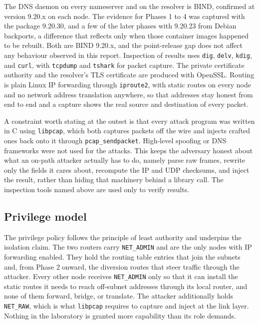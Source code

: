 \documentclass[11pt]{article}
\begin{document}
The DNS daemon on every nameserver and on the resolver is BIND, confirmed at
version 9.20.x on each node. The evidence for Phases 1 to 4 was captured with the
package 9.20.30, and a few of the later phases with 9.20.23 from Debian
backports, a difference that reflects only when those container images happened
to be rebuilt. Both are BIND 9.20.x, and the point-release gap does not affect any
behaviour observed in this report. Inspection of results uses \texttt{dig},
\texttt{delv}, \texttt{kdig}, and \texttt{curl}, with \texttt{tcpdump} and
\texttt{tshark} for packet capture. The private certificate authority and the
resolver's TLS certificate are produced with OpenSSL. Routing is plain Linux IP
forwarding through \texttt{iproute2}, with static routes on every node and no
network address translation anywhere, so that addresses stay honest from end to
end and a capture shows the real source and destination of every packet.

A constraint worth stating at the outset is that every attack program was written
in C using \texttt{libpcap}, which both captures packets off the wire and injects
crafted ones back onto it through \texttt{pcap\_sendpacket}. High-level spoofing
or DNS frameworks were not used for the attacks. This keeps the adversary honest
about what an on-path attacker actually has to do, namely parse raw frames,
rewrite only the fields it cares about, recompute the IP and UDP checksums, and
inject the result, rather than hiding that machinery behind a library call. The
inspection tools named above are used only to verify results.

\subsection{Privilege model}

The privilege policy follows the principle of least authority and underpins the
isolation claim. The two routers carry \texttt{NET\_ADMIN} and are the only nodes
with IP forwarding enabled. They hold the routing table entries that join the
subnets and, from Phase 2 onward, the diversion routes that steer traffic through
the attacker. Every other node receives \texttt{NET\_ADMIN} only so that it can
install the static routes it needs to reach off-subnet addresses through its local
router, and none of them forward, bridge, or translate. The attacker additionally
holds \texttt{NET\_RAW}, which is what \texttt{libpcap} requires to capture and
inject at the link layer. Nothing in the laboratory is granted more capability
than its role demands.
\end{document}

